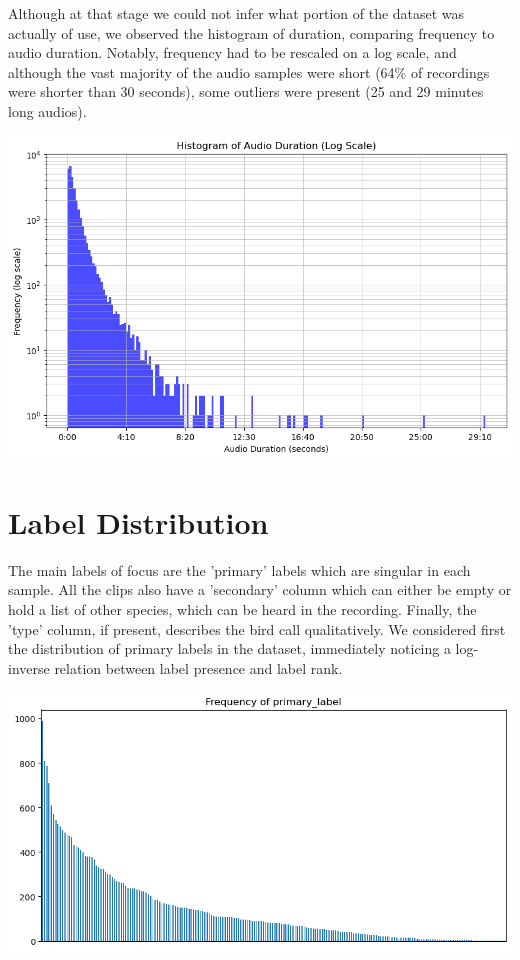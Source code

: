 \documentclass[11pt]{article}
\begin{document}
\begin{minipage}{0.48\linewidth}
  Although at that stage we could not infer what portion of the dataset was actually of use, we observed the histogram of duration, comparing frequency to audio duration. Notably, frequency had to be rescaled on a log scale, and although the vast majority of the audio samples were short (64\% of recordings were shorter than 30 seconds), some outliers were present (25 and 29 minutes long audios).
\end{minipage}
\hfill
\begin{minipage}{0.48\linewidth}
  \includegraphics[width=\linewidth]{img/training_duration_histogram.png}
\end{minipage}

\section*{Label Distribution}

\begin{minipage}{0.48\linewidth}
  The main labels of focus are the 'primary' labels which are singular in each sample. All the clips also have a 'secondary' column which can either be empty or hold a list of other species, which can be heard in the recording. Finally, the 'type' column, if present, describes the bird call qualitatively. We considered first the distribution of primary labels in the dataset, immediately noticing a log-inverse relation between label presence and label rank.
\end{minipage}
\hfill
\begin{minipage}{0.48\linewidth}
  \includegraphics[width=\linewidth]{img/train_primary_histogram.png}
\end{minipage}
\end{document}
